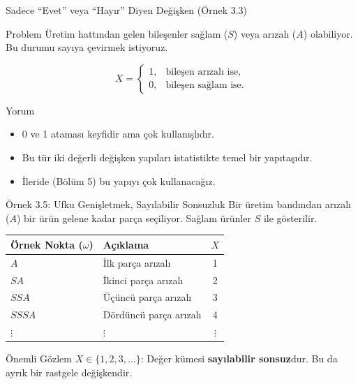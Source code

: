 ﻿\documentclass[light]{lutbeamer}
\begin{document}
\begin{frame}{Sadece ``Evet'' veya ``Hayır'' Diyen Değişken (Örnek 3.3)}
\begin{block}{Problem}
  Üretim hattından gelen bileşenler sağlam ($S$) veya arızalı ($A$) olabiliyor.
  Bu durumu sayıya çevirmek istiyoruz.
\end{block}

\[
X =
\begin{cases}
1, & \text{bileşen arızalı ise},\\
0, & \text{bileşen sağlam ise}.
\end{cases}
\]

\begin{block}{Yorum}
  \begin{itemize}
    \item 0 ve 1 ataması keyfidir ama çok kullanışlıdır.
    \item Bu tür iki değerli değişken yapıları istatistikte temel bir yapıtaşıdır.
    \item İleride (Bölüm 5) bu yapıyı çok kullanacağız.
  \end{itemize}
\end{block}
\end{frame}

\begin{frame}{Örnek 3.5: Ufku Genişletmek, Sayılabilir Sonsuzluk}
\small
Bir üretim bandından arızalı ($A$) bir ürün gelene kadar parça seçiliyor. Sağlam ürünler $S$ ile gösterilir.
\begin{center}
\begin{tabular}{llc}
    \toprule
    Örnek Nokta ($\omega$) & Açıklama & $X$ \\
    \midrule
    $A$ & İlk parça arızalı & 1 \\
    $SA$ & İkinci parça arızalı & 2 \\
    $SSA$ & Üçüncü parça arızalı & 3 \\
    $SSSA$ & Dördüncü parça arızalı & 4 \\
    $\vdots$ & $\vdots$ & $\vdots$ \\
    \bottomrule
\end{tabular}
\end{center}
\begin{alertblock}{Önemli Gözlem}
    $X \in \{1, 2, 3, \dots\}$: Değer kümesi \textbf{sayılabilir sonsuz}dur. Bu da ayrık bir rastgele değişkendir.
\end{alertblock}
\end{frame}
\end{document}
